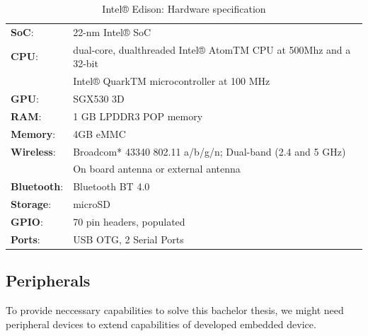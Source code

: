 \begin{table}[H]
 \begin{center}
   \begin{tabular}{l l}
   \hline
   	\textbf{SoC}: & 22-nm Intel® SoC\\
	\textbf{CPU}: & dual-core, dualthreaded Intel® AtomTM CPU at 500Mhz and a 32-bit \\
   	& Intel® QuarkTM microcontroller at 100 MHz\\
	\textbf{GPU}: & SGX530 3D\\
	\textbf{RAM}: & 1 GB LPDDR3 POP memory\\
	\textbf{Memory}:& 4GB eMMC\\
	\textbf{Wireless}: & Broadcom* 43340 802.11 a/b/g/n; Dual-band (2.4 and 5 GHz)\\
	& On board antenna or external antenna \\
	\textbf{Bluetooth}: & Bluetooth BT 4.0\\
	\textbf{Storage}: & microSD\\
	\textbf{GPIO}: & 70 pin headers, populated\\
	\textbf{Ports}: & USB OTG, 2 Serial Ports\\
   \hline
   \end{tabular}
 \end{center}
 \caption{Intel® Edison: Hardware specification}
 \label{tab:tab13}
\end{table}

\subsection{Peripherals} %
\label{sub:peripherals}
To provide neccessary capabilities to solve this bachelor thesis, we might need peripheral devices to extend capabilities of developed embedded device.
